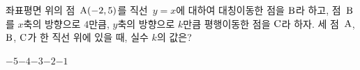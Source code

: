 좌표평면 위의 점~$\mathrm{A}(-2{,}\mkern3mu 5)$를 직선~$y=x$에 대하여 대칭이동한 점을 $\mathrm{B}$라 하고, 점~$\mathrm{B}$를 $x$축의 방향으로 $4$만큼, $y$축의 방향으로 $k$만큼 평행이동한 점을 $\mathrm{C}$라 하자. 세 점~$\mathrm{A}$, $\mathrm{B}$, $\mathrm{C}$가 한 직선 위에 있을 때, 실수 $k$의 값은?
\begin{choices32}{$-5$}{$-4$}{$-3$}{$-2$}{$-1$}\end{choices32}
